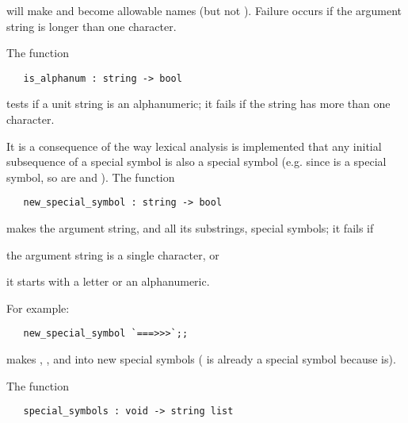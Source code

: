 \noindent will make  and  become allowable names (but not
). Failure occurs if the argument string is longer than one
character.

The function

\begin{boxed}
\begin{verbatim}
   is_alphanum : string -> bool
\end{verbatim}\end{boxed}

\noindent tests if a unit string is an alphanumeric; it fails if the string
has more than one character.

It is a consequence of the way lexical analysis is implemented that any
initial subsequence of a special symbol is also a special symbol (e.g. since
\ml{==>} is a special symbol, so are \ml{==} and \ml{=}). The function

\begin{boxed}
\begin{verbatim}
   new_special_symbol : string -> bool
\end{verbatim}\end{boxed}
  
\noindent makes the argument string, and all its substrings, special symbols;
it fails if 
\begin{myenumerate}
\item the argument string is a single character, or 
\item it starts with a letter or an alphanumeric. 
\end{myenumerate}

\noindent For example:

\begin{hol}\begin{verbatim}
   new_special_symbol `===>>>`;;
\end{verbatim}\end{hol}

\noindent makes \ml{===>>>}, \ml{===>>}, \ml{===>} and \ml{===} 
into new special symbols 
(\ml{==} is already a special symbol because \ml{==>} is).

The function

\begin{boxed}
\begin{verbatim}
   special_symbols : void -> string list
\end{verbatim}\end{boxed}

